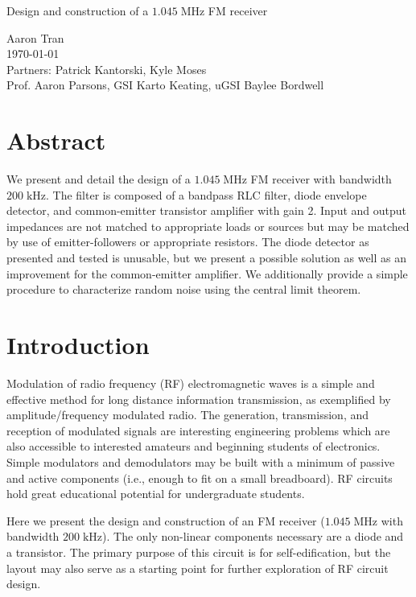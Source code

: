 \documentclass[11pt]{article}
\newcommand {\mt}{\mathrm}
\newcommand {\unit}[1]{\; \mt{#1}}
\begin{document}
\begin{center}
\Large{Design and construction of a $1.045 \unit{MHz}$ FM receiver}

\large
Aaron Tran \\
\today \\
Partners: Patrick Kantorski, Kyle Moses \\
Prof. Aaron Parsons, GSI Karto Keating, uGSI Baylee Bordwell
\end{center}

\section*{\sffamily Abstract}

We present and detail the design of a $1.045 \unit{MHz}$ FM receiver with
bandwidth $200 \unit{kHz}$.  The filter is composed of a bandpass RLC filter,
diode envelope detector, and common-emitter transistor amplifier with gain 2.
Input and output impedances are not matched to appropriate loads or sources but
may be matched by use of emitter-followers or appropriate resistors.  The diode
detector as presented and tested is unusable, but we present a possible
solution as well as an improvement for the common-emitter amplifier.  We
additionally provide a simple procedure to characterize random noise using the
central limit theorem.

\section{Introduction}

Modulation of radio frequency (RF) electromagnetic waves is a simple and
effective method for long distance information transmission, as exemplified by
amplitude/frequency modulated radio.  The generation, transmission, and
reception of modulated signals are interesting engineering problems which are
also accessible to interested amateurs and beginning students of electronics.
Simple modulators and demodulators may be built with a minimum
of passive and active components (i.e., enough to fit on a small breadboard).
RF circuits hold great educational potential for undergraduate students.

Here we present the design and construction of an FM receiver ($1.045
\unit{MHz}$ with bandwidth $200 \unit{kHz}$).  The only non-linear components
necessary are a diode and a transistor.  The primary purpose of this circuit is for self-edification, but the layout may also serve as a starting point for
further exploration of RF circuit design.
\end{document}
